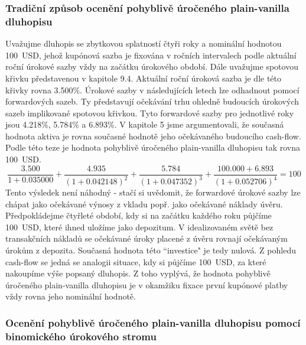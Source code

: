 \documentclass[a4paper]{book}
\begin{document}
\subsubsection{Tradiční způsob ocenění pohyblivě úročeného plain-vanilla dluhopisu}

Uvažujme dluhopis se zbytkovou splatností čtyři roky a nominální hodnotou 100~USD, jehož kupónová sazba je fixována v ročních intervalech podle aktuální roční úrokové sazby vždy na začátku úrokového období. Dále uvažujme spotovou křivku představenou v kapitole 9.4. Aktuální roční úroková sazba je dle této křivky rovna 3.500\%. Úrokové sazby v následujících letech lze odhadnout pomocí forwardových sazeb. Ty představují očekávání trhu ohledně budoucích úrokových sazeb implikované spotovou křivkou. Tyto forwardové sazby pro jednotlivé roky jsou 4.218\%, 5.784\% a 6.893\%. V kapitole 5 jsme argumentovali, že současná hodnota aktiva je rovna současné hodnotě jeho očekávaného budoucího cash-flow. Podle této teze je hodnota pohyblivě úročeného plain-vanilla dluhopisu tak rovna 100~USD.
\begin{equation*}
\frac{3.500}{1 + 0.035000} + \frac{4.935}{(1 + 0.042148)^2} + \frac{5.784}{(1 + 0.047352)^3}+ \frac{100.000 + 6.893}{(1 + 0.052706)^4} = 100
\end{equation*}
Tento výsledek není náhodný - stačí si uvědomit, že forwardové úrokové sazby lze chápat jako očekávané výnosy z vkladu popř. jako očekávané náklady úvěru. Předpokládejme čtyřleté období, kdy si na začátku každého roku půjčíme 100~USD, které ihned uložíme jako depozitum. V idealizovaném světě bez transakčních nákladů se očekávané úroky placené z úvěru rovnají očekávaným úrokům z depozita. Současná hodnota této ``investice" je tedy nulová. Z pohledu cash-flow se jedná se analogii situace, kdy si půjčíme 100~USD, za které nakoupíme výše popsaný dluhopis. Z toho vyplývá, že hodnota pohyblivě úročeného plain-vanilla dluhopisu je v okamžiku fixace první kupónové platby vždy rovna jeho nominální hodnotě.

\subsubsection{Ocenění pohyblivě úročeného plain-vanilla dluhopisu pomocí binomického úrokového stromu}
\end{document}
